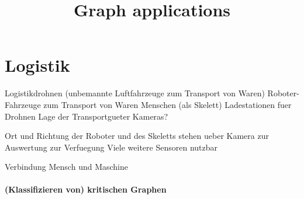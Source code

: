 \documentclass[pdftex,10pt,a4paper]{scrartcl}
\title{Graph applications}
\date{\vspace{-5ex}}
\begin{document}
\maketitle

\section{Logistik}

Logistikdrohnen (unbemannte Luftfahrzeuge zum Transport von Waren)
Roboter-Fahrzeuge zum Transport von Waren
Menschen (als Skelett)
Ladestationen fuer Drohnen
Lage der Transportgueter
Kameras?

Ort und Richtung der Roboter und des Skeletts stehen ueber Kamera zur Auswertung zur Verfuegung
Viele weitere Sensoren nutzbar

Verbindung Mensch und Maschine

\paragraph{(Klassifizieren von) kritischen Graphen}
\end{document}
